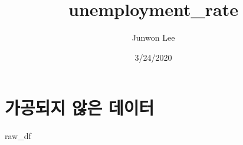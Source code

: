 \documentclass[]{article}
\title{unemployment\_rate}
\author{Junwon Lee}
\date{3/24/2020}
\newenvironment{Shaded}{\begin{snugshade}}{\end{snugshade}}
\newcommand{\NormalTok}[1]{#1}
\begin{document}
\maketitle

\hypertarget{uxac00uxacf5uxb418uxc9c0-uxc54auxc740-uxb370uxc774uxd130}{%
\section{가공되지 않은
데이터}\label{uxac00uxacf5uxb418uxc9c0-uxc54auxc740-uxb370uxc774uxd130}}

\begin{Shaded}
\begin{Highlighting}[]
\NormalTok{raw_df}
\end{Highlighting}
\end{Shaded}
\end{document}
